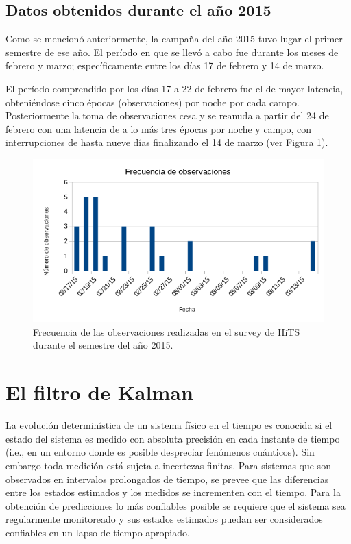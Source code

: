 \subsection{Datos obtenidos durante el a\~no 2015}\label{ssec:data}
Como se mencion\'o anteriormente, la campa\~na del a\~no 2015 tuvo lugar el primer semestre de ese a\~no. El per\'iodo en que se llev\'o a cabo fue durante los meses de febrero y marzo; espec\'ificamente entre los d\'ias 17 de febrero y 14 de marzo.
\bigskip

El per\'iodo comprendido por los d\'ias 17 a 22 de febrero fue el de mayor latencia, obteni\'endose cinco \'epocas (observaciones) por noche por cada campo. Posteriormente la toma de observaciones cesa y se reanuda a partir del 24 de febrero con una latencia de a lo m\'as tres \'epocas por noche y campo, con interrupciones de hasta nueve d\'ias finalizando el 14 de marzo (ver Figura \ref{fig:cadencia}). 

\begin{figure}
\centering
\includegraphics[scale=1.0]{images/cadencia}
\caption{Frecuencia de las observaciones realizadas en el survey de HiTS durante el semestre del a\~no 2015.}
\label{fig:cadencia}
\end{figure}

\section{El filtro de Kalman}
La evoluci\'on determin\'istica de un sistema f\'isico en el tiempo es conocida si el estado del sistema es medido con absoluta precisi\'on en cada instante de tiempo (i.e., en un entorno donde es posible despreciar fen\'omenos cu\'anticos). Sin embargo toda medici\'on est\'a sujeta a incertezas finitas. Para sistemas que son observados en intervalos prolongados de tiempo, se prevee que las diferencias entre los estados estimados y los medidos se incrementen con el tiempo. Para la obtenci\'on de predicciones lo m\'as confiables posible se requiere que el sistema sea regularmente monitoreado y sus estados estimados puedan ser considerados confiables en un lapso de tiempo apropiado. 
\bigskip

